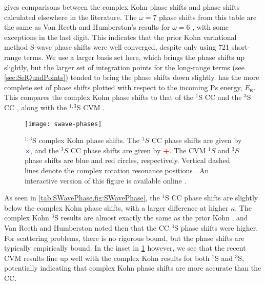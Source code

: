 \documentclass[Dissertation.tex]{subfiles}
\begin{document}
 gives comparisons between the complex Kohn phase 
shifts and phase shifts calculated elsewhere in the literature. The $\omega = 
7$ phase shifts from this table are the same as Van Reeth and 
Humberston's results for $\omega = 6$ \cite{VanReeth2003}, with some 
exceptions in the last digit. This indicates that the prior Kohn variational 
method S-wave phase shifts were well converged, despite only using 721
short-range terms. 
We use a larger basis set here, which brings the phase shifts up slightly,
but the larger set of integration points for the long-range terms (see
\cref{sec:SelQuadPoints}) tended to bring the phase shifts down slightly.
 has the more complete set of phase shifts plotted with 
respect to the incoming Ps energy, $E_{\bm \kappa}$. This compares the 
complex Kohn phase shifts to that of the $^1$S CC \cite{Walters2004} and the $
^3$S CC \cite{Blackwood2002}, along with the $^{1,3}$S CVM \cite{Zhang2012}. 

\begin{figure}
	\centering
	\texttt{[image: swave-phases]}
	\caption[$^{1,3}$S phase shifts]{$^{1,3}$S complex Kohn phase shifts. The $^1S$ CC phase shifts
\cite{Walters2004} are given by \mbox{\textcolor{blue}{$\times$}}, and the
$^3S$ CC phase shifts \cite{Blackwood2002} are given by
\mbox{\textcolor{red}{\textbf{+}}}. The CVM $^1S$ and $^3S$ phase shifts
\cite{Zhang2012} are blue and red circles,
respectively. Vertical dashed lines denote the complex rotation resonance
positions \cite{Yan1999,Yan1998a,Ho1998}. An interactive version of this
figure is available online \cite{Plotly}.}
	\label{fig:SWavePhase}
\end{figure}

As seen in \cref{tab:SWavePhase,fig:SWavePhase}, the $^1$S CC phase 
shifts are slightly below the complex Kohn phase shifts, with a larger 
difference at higher $\kappa$. The complex Kohn $^3$S results are almost 
exactly the same as the prior Kohn \cite{VanReeth2003}, and Van Reeth and 
Humberston noted then that the CC $^3$S phase shifts were higher. For 
scattering problems, there is no rigorous bound, but the phase shifts are
typically empirically bound. In the inset in
\cref{fig:SWavePhase} however, we see that the recent CVM results line up 
well with the complex Kohn results for both $^1$S and $^3$S, potentially indicating 
that complex Kohn phase shifts are more accurate than the CC.
\end{document}
